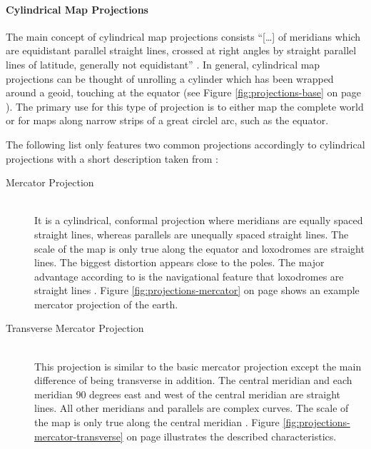 \paragraph{Cylindrical Map Projections}
The main concept of cylindrical map projections consists ``[\ldots] of meridians which are equidistant parallel straight lines, crossed at right angles by straight parallel lines of latitude, generally not equidistant'' .
In general, cylindrical map projections can be thought of unrolling a cylinder which has been wrapped around a geoid, touching at the equator (see Figure \ref{fig:projections-base} on page \pageref{fig:projections-base}).
The primary use for this type of projection is to either map the complete world or for maps along narrow strips of a great circlel arc, such as the equator.

The following list only features two common projections accordingly to cylindrical projections with a short description taken from \citeauthor{Snyder1987} :

\begin{description}

\item[Mercator Projection] \hfill \\
It is a cylindrical, conformal projection where meridians are equally spaced straight lines, whereas parallels are unequally spaced straight lines. The scale of the map is only true along the equator and loxodromes are straight lines. The biggest distortion appears close to the poles. The major advantage according to \citeauthor{Snyder1987} is the navigational feature that loxodromes are straight lines . Figure \ref{fig:projections-mercator} on page \pageref{fig:projections-mercator} shows an example mercator projection of the earth.

\newpage
\item[Transverse Mercator Projection] \hfill \\
This projection is similar to the basic mercator projection except the main difference of being transverse in addition. The central meridian and each meridian 90 degrees east and west of the central meridian are straight lines. All other meridians and parallels are complex curves. The scale of the map is only true along the central meridian . Figure \ref{fig:projections-mercator-transverse} on page \pageref{fig:projections-mercator-transverse} illustrates the described characteristics.

\end{description}

